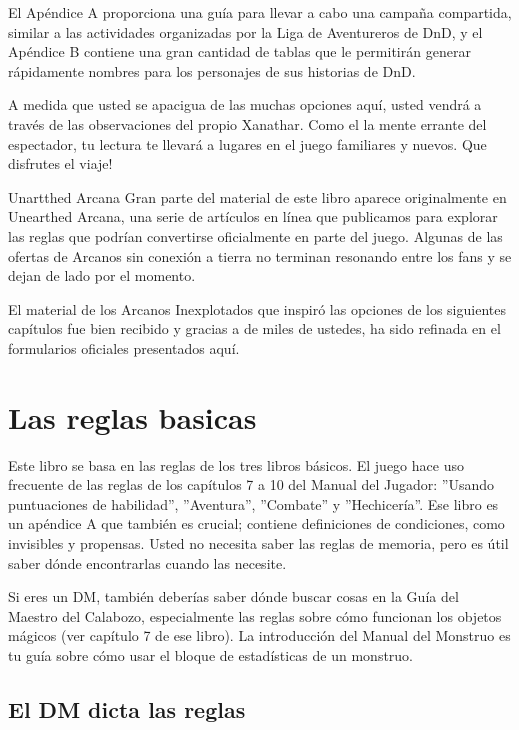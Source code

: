 \documentclass[a4paper,twocolumn,openany,10pt]{dndbook}
\begin{document}
El Apéndice A proporciona una guía para llevar a cabo una campaña compartida, similar a las actividades organizadas por la Liga
de Aventureros de DnD, y el Apéndice B contiene una gran cantidad de tablas que le permitirán generar rápidamente nombres para
los personajes de sus historias de DnD.

A medida que usted se apacigua de las muchas opciones aquí, usted vendrá a través de las observaciones del propio Xanathar. Como
el la mente errante del espectador, tu lectura te llevará a lugares en el juego familiares y nuevos. Que disfrutes el viaje!

\begin{paperbox}[float=!b]{Unartthed Arcana}
Gran parte del material de este libro aparece originalmente en Unearthed Arcana, una serie de artículos en línea que publicamos
para explorar las reglas que podrían convertirse oficialmente en parte del juego. Algunas de las ofertas de Arcanos sin conexión 
a tierra no terminan resonando entre los fans y se dejan de lado por el momento.

El material de los Arcanos Inexplotados que inspiró las opciones de los siguientes capítulos fue bien recibido y gracias a de 
miles de ustedes, ha sido refinada en el formularios oficiales presentados aquí. 
\end{paperbox}

\section{Las reglas basicas}

Este libro se basa en las reglas de los tres libros básicos. El juego hace uso frecuente de las reglas de los capítulos 7 a 10
del Manual del Jugador: ''Usando puntuaciones de habilidad'', ''Aventura'', ''Combate'' y ''Hechicería''. Ese libro es un
apéndice A que también es crucial; contiene definiciones de condiciones, como invisibles y propensas. Usted no necesita saber las
reglas de memoria, pero es útil saber dónde encontrarlas cuando las necesite.

Si eres un DM, también deberías saber dónde buscar cosas en la Guía del Maestro del Calabozo, especialmente las reglas sobre cómo
funcionan los objetos mágicos (ver capítulo 7 de ese libro). La introducción del Manual del Monstruo es tu guía sobre cómo usar el
bloque de estadísticas de un monstruo.

\subsection{El DM dicta las reglas}
\end{document}
